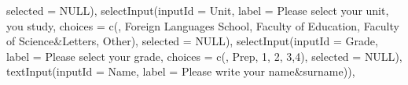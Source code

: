 \documentclass[
]{article}
\newenvironment{Shaded}{\begin{snugshade}}{\end{snugshade}}
\newcommand{\AttributeTok}[1]{\textcolor[rgb]{0.77,0.63,0.00}{#1}}
\newcommand{\ConstantTok}[1]{\textcolor[rgb]{0.00,0.00,0.00}{#1}}
\newcommand{\FunctionTok}[1]{\textcolor[rgb]{0.00,0.00,0.00}{#1}}
\newcommand{\NormalTok}[1]{#1}
\newcommand{\StringTok}[1]{\textcolor[rgb]{0.31,0.60,0.02}{#1}}
\begin{document}
\begin{Shaded}
\begin{Highlighting}[]
                                           \AttributeTok{selected =} \ConstantTok{NULL}\NormalTok{),}
                               \FunctionTok{selectInput}\NormalTok{(}\AttributeTok{inputId =} \StringTok{\textquotesingle{}Unit\textquotesingle{}}\NormalTok{,}
                                           \AttributeTok{label =} \StringTok{\textquotesingle{}Please select your unit, you study\textquotesingle{}}\NormalTok{,}
                                           \AttributeTok{choices =} \FunctionTok{c}\NormalTok{(}\StringTok{\textquotesingle{}\textquotesingle{}}\NormalTok{, }\StringTok{\textquotesingle{}Foreign Languages School\textquotesingle{}}\NormalTok{, }\StringTok{\textquotesingle{}Faculty of Education\textquotesingle{}}\NormalTok{, }\StringTok{\textquotesingle{}Faculty of Science\&Letters\textquotesingle{}}\NormalTok{, }\StringTok{\textquotesingle{}Other\textquotesingle{}}\NormalTok{),}
                                           \AttributeTok{selected =} \ConstantTok{NULL}\NormalTok{),}
                               \FunctionTok{selectInput}\NormalTok{(}\AttributeTok{inputId =} \StringTok{\textquotesingle{}Grade\textquotesingle{}}\NormalTok{,}
                                           \AttributeTok{label =} \StringTok{\textquotesingle{}Please select your grade\textquotesingle{}}\NormalTok{,}
                                           \AttributeTok{choices =} \FunctionTok{c}\NormalTok{(}\StringTok{\textquotesingle{}\textquotesingle{}}\NormalTok{, }\StringTok{\textquotesingle{}Prep\textquotesingle{}}\NormalTok{, }\StringTok{\textquotesingle{}1\textquotesingle{}}\NormalTok{, }\StringTok{\textquotesingle{}2\textquotesingle{}}\NormalTok{, }\StringTok{\textquotesingle{}3\textquotesingle{}}\NormalTok{,}\StringTok{\textquotesingle{}4\textquotesingle{}}\NormalTok{),}
                                           \AttributeTok{selected =} \ConstantTok{NULL}\NormalTok{),}
                               \FunctionTok{textInput}\NormalTok{(}\AttributeTok{inputId =} \StringTok{\textquotesingle{}Name\textquotesingle{}}\NormalTok{,}
                                         \AttributeTok{label =} \StringTok{\textquotesingle{}Please write your name\&surname\textquotesingle{}}\NormalTok{)),}
            

\end{Highlighting}
\end{Shaded}
\end{document}
